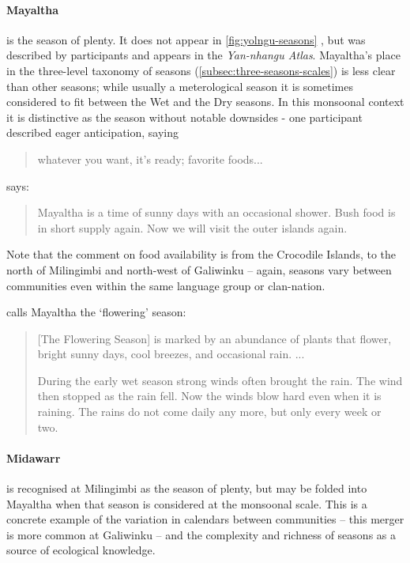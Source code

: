\paragraph{Mayaltha} is the season of plenty.  It does not appear in
\cref{fig:yolngu-seasons} \citep{davis1989}, but was described by
participants and appears in the \textit{Yan-nhangu Atlas}.  Mayaltha's
place in the three-level taxonomy of seasons (\cref{subsec:three-seasons-scales})
is less clear than other seasons; while usually a meterological season
it is sometimes considered to fit between the Wet and the Dry seasons.
In this monsoonal context it is distinctive as the season without notable
downsides - one participant described eager anticipation, saying \blockquote{
    whatever you want, it's ready; favorite foods... 
}.

\citet[][p36]{atlas2014} says: \blockquote{
    Mayaltha is a time of sunny days with an occasional shower. Bush food
    is in short supply again.  Now we will visit the outer islands again.
}.  Note that the comment on food availability is from the Crocodile Islands,
to the north of Milingimbi and north-west of Galiwinku -- again, seasons
vary between communities even within the same language group or clan-nation.

\citet{davis1989} calls Mayaltha the `flowering' season:
\blockquote{
    [The Flowering Season] is marked by an abundance of plants that flower,
    bright sunny days, cool breezes, and occasional rain. ...

    During the early wet season strong winds often brought the rain.
    The wind then stopped as the rain fell.
    Now the winds blow hard even when it is raining.
    The rains do not come daily any more, but only every week or two.
}


\paragraph{Midawarr} is recognised at Milingimbi as the season of plenty,
but may be folded into Mayaltha when that season is considered at the
monsoonal scale.  This is a concrete example of the variation in calendars
between communities -- this merger is more common at Galiwinku -- and the
complexity and richness of seasons as a source of ecological knowledge.

